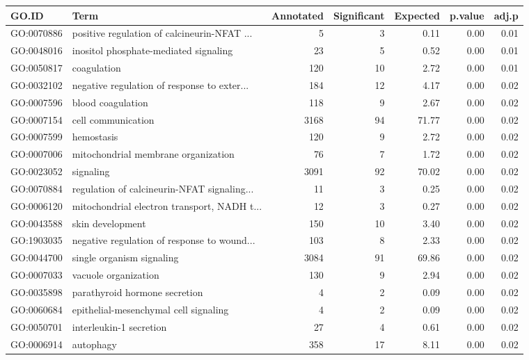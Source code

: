 \begin{table}[ht]
\centering
\begin{tabular}{llrrrrr}
  \hline
GO.ID & Term & Annotated & Significant & Expected & p.value & adj.p \\ 
  \hline
GO:0070886 & positive regulation of calcineurin-NFAT ... &   5 &   3 & 0.11 & 0.00 & 0.01 \\ 
  GO:0048016 & inositol phosphate-mediated signaling &  23 &   5 & 0.52 & 0.00 & 0.01 \\ 
  GO:0050817 & coagulation & 120 &  10 & 2.72 & 0.00 & 0.01 \\ 
  GO:0032102 & negative regulation of response to exter... & 184 &  12 & 4.17 & 0.00 & 0.02 \\ 
  GO:0007596 & blood coagulation & 118 &   9 & 2.67 & 0.00 & 0.02 \\ 
  GO:0007154 & cell communication & 3168 &  94 & 71.77 & 0.00 & 0.02 \\ 
  GO:0007599 & hemostasis & 120 &   9 & 2.72 & 0.00 & 0.02 \\ 
  GO:0007006 & mitochondrial membrane organization &  76 &   7 & 1.72 & 0.00 & 0.02 \\ 
  GO:0023052 & signaling & 3091 &  92 & 70.02 & 0.00 & 0.02 \\ 
  GO:0070884 & regulation of calcineurin-NFAT signaling... &  11 &   3 & 0.25 & 0.00 & 0.02 \\ 
  GO:0006120 & mitochondrial electron transport, NADH t... &  12 &   3 & 0.27 & 0.00 & 0.02 \\ 
  GO:0043588 & skin development & 150 &  10 & 3.40 & 0.00 & 0.02 \\ 
  GO:1903035 & negative regulation of response to wound... & 103 &   8 & 2.33 & 0.00 & 0.02 \\ 
  GO:0044700 & single organism signaling & 3084 &  91 & 69.86 & 0.00 & 0.02 \\ 
  GO:0007033 & vacuole organization & 130 &   9 & 2.94 & 0.00 & 0.02 \\ 
  GO:0035898 & parathyroid hormone secretion &   4 &   2 & 0.09 & 0.00 & 0.02 \\ 
  GO:0060684 & epithelial-mesenchymal cell signaling &   4 &   2 & 0.09 & 0.00 & 0.02 \\ 
  GO:0050701 & interleukin-1 secretion &  27 &   4 & 0.61 & 0.00 & 0.02 \\ 
  GO:0006914 & autophagy & 358 &  17 & 8.11 & 0.00 & 0.02 \\ 

\end{tabular}
\end{table}
